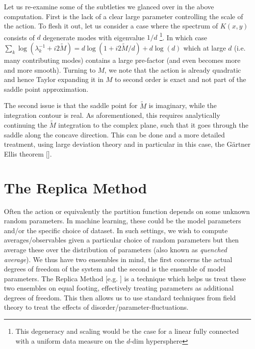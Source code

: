 Let us re-examine some of the subtleties we glanced over in the above computation. First is the lack of a clear large parameter controlling the scale of the action. To flesh it out, let us consider a case where the spectrum of $K(x,y)$ consists of $d$ degenerate modes with eigenvalue $1/d$ \footnote{This degeneracy and scaling would be the case for a linear fully connected with a uniform data measure on the $d$-dim hypersphere}. In which case $\sum_k \log(\lambda_k^{-1} + i 2\tilde{M})=d \log(1 + i 2\tilde{M}/d)+d\log(d)$ which at large $d$ (i.e. many contributing modes) contains a large pre-factor (and even becomes more and more smooth). Turning to $M$, we note that the action is already quadratic and hence Taylor expanding it in $M$ to second order is exact and not part of the saddle point approximation. 

The second issue is that the saddle point for $\tilde{M}$ is imaginary, while the integration contour is real. As aforementioned, this requires analytically continuing the $\tilde{M}$ integration to the complex plane, such that it goes through the saddle along the concave direction. This can be done and a more detailed treatment, using large deviation theory and in particular in this case, the G\"{a}rtner Ellis theorem [\cite{touchette2009large}]. 
 
\section{The Replica Method}
\label{Sec:Replicas}
Often the action or equivalently the partition function depends on some unknown random parameters.  In machine learning, these could be the model parameters and/or the specific choice of dataset. In such settings, we wish to compute averages/observables given a particular choice of random parameters but then average these over the distribution of parameters (also known as {\it quenched average}). We thus have two ensembles in mind, the first concerns the actual degrees of freedom of the system and the second is the ensemble of model parameters. The Replica Method [e.g.  \cite{MezardBook}] is a technique which helps us treat these two ensembles on equal footing, effectively treating parameters as additional degrees of freedom. This then allows us to use standard techniques from field theory to treat the effects of disorder/parameter-fluctuations.

